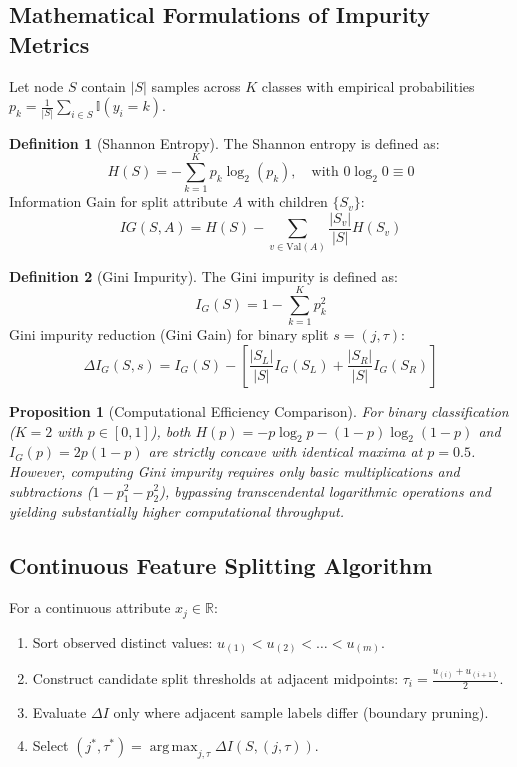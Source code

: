 \documentclass[11pt,a4paper]{article}
\theoremstyle{definition}
\newtheorem{definition}{Definition}[section]
\theoremstyle{plain}
\newtheorem{proposition}[theorem]{Proposition}
\theoremstyle{remark}
\DeclareMathOperator*{\argmax}{arg\,max}
\newcommand{\R}{\mathbb{R}}
\begin{document}
\subsection{Mathematical Formulations of Impurity Metrics}
Let node $S$ contain $|S|$ samples across $K$ classes with empirical probabilities $p_k = \frac{1}{|S|}\sum_{i \in S} \mathbb{I}(y_i = k)$.
\begin{definition}[Shannon Entropy]
The Shannon entropy \cite{quinlan1986induction} is defined as:
\begin{equation}
H(S) = -\sum_{k=1}^K p_k \log_2(p_k), \quad \text{with } 0 \log_2 0 \equiv 0
\end{equation}
Information Gain for split attribute $A$ with children $\{S_v\}$:
\begin{equation}
IG(S, A) = H(S) - \sum_{v \in \mathrm{Val}(A)} \frac{|S_v|}{|S|} H(S_v)
\end{equation}
\end{definition}

\begin{definition}[Gini Impurity]
The Gini impurity \cite{breiman1984classification} is defined as:
\begin{equation}
I_G(S) = 1 - \sum_{k=1}^K p_k^2
\end{equation}
Gini impurity reduction (Gini Gain) for binary split $s = (j, \tau)$:
\begin{equation}
\Delta I_G(S, s) = I_G(S) - \left[ \frac{|S_L|}{|S|} I_G(S_L) + \frac{|S_R|}{|S|} I_G(S_R) \right]
\end{equation}
\end{definition}

\begin{proposition}[Computational Efficiency Comparison]
For binary classification ($K=2$ with $p \in [0, 1]$), both $H(p) = -p \log_2 p - (1-p)\log_2(1-p)$ and $I_G(p) = 2p(1-p)$ are strictly concave with identical maxima at $p = 0.5$. However, computing Gini impurity requires only basic multiplications and subtractions ($1 - p_1^2 - p_2^2$), bypassing transcendental logarithmic operations and yielding substantially higher computational throughput.
\end{proposition}

\subsection{Continuous Feature Splitting Algorithm}
For a continuous attribute $x_j \in \R$:
\begin{enumerate}[noitemsep]
    \item Sort observed distinct values: $u_{(1)} < u_{(2)} < \dots < u_{(m)}$.
    \item Construct candidate split thresholds at adjacent midpoints: $\tau_i = \frac{u_{(i)} + u_{(i+1)}}{2}$.
    \item Evaluate $\Delta I$ only where adjacent sample labels differ (boundary pruning).
    \item Select $(j^*, \tau^*) = \argmax_{j, \tau} \Delta I(S, (j, \tau))$.
\end{enumerate}
\end{document}
